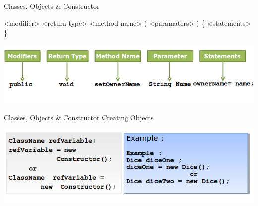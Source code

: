 \documentclass[14pt]{beamer}
\begin{document}
\begin{frame}{Classes, Objects \& Constructor}
\begin{block}{}
   <modifier>  <return type>  <method name> ( <paramaters> )  \{  
       <statements>
   \} 
\end{block}

\begin{center}
  \includegraphics[scale=0.5]{COJ-M01-S03-Image13.png}
\end{center}
\end{frame}
\begin{frame}{Classes, Objects \& Constructor}
Creating Objects
\begin{center}
      \includegraphics[scale=0.5]{COJ-M01-S03-Image14.png}
  \end{center}
  \end{frame}
\end{document}
